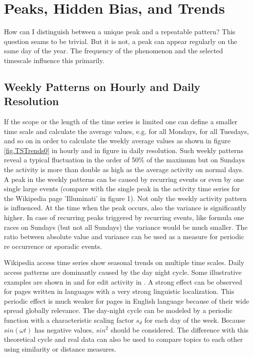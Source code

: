 \documentclass[a4paper,10pt]{scrbook}
\begin{document}
\section{Peaks, Hidden Bias, and Trends}

How can I distinguish between a unique peak and a repeatable pattern? This question seams to be trivial. But it is not, a peak can appear regularly on the same day of the year. The frequency of the phenomenon and the selected timescale influence this primarily. 

\subsection{Weekly Patterns on Hourly and Daily Resolution}
If the scope or the length of the time series is limited one can define a smaller time scale and calculate the average values, e.g. for all Mondays, for all Tuesdays, and so on in order to calculate the weekly average values as shown in figure \ref{fig.TSTrends0} in hourly and in figure \label{fig.TSTrends1} in daily resolution. Such weekly patterns reveal a typical fluctuation in the order of 50\% of the maximum but on Sundays the activity is more than double as high as the average activity on normal days. A peak in the weekly patterns can be caused by recurring events or even by one single large events (compare with the single peak in the activity time series for the Wikipedia page 'Illuminati' in \cite{Kaempf2012b} figure 1). Not only the weekly activity pattern is influenced. At the time when the peak occurs, also the variance is significantly higher. In case of recurring peaks triggered by recurring events, like formula one races on Sundays (but not all Sundays) the variance would be much smaller. The ratio between absolute value and variance can be used as a measure for periodic re occurrence  or sporadic events. 

\label{ext.fig.TSTrends0} 


Wikipedia access time series show seasonal trends on multiple time scales. Daily access patterns are dominantly caused by the day night cycle. Some illustrative examples are shown in \cite{2013arXiv1308.1776S} and for edit activity in \cite{Yasseri2012}. A strong effect can be observed for pages written in languages with a very strong linguistic localization. This periodic effect is much weaker for pages in English language because of their wide spread globally relevance. The day-night cycle can be modeled by a periodic function with a characteristic scaling factor $s_d$ for each day of the week. Because $sin( \omega t)$ has negative values, $sin^2$ should be considered. The difference with this theoretical cycle and real data can also be used to compare topics to each other using similarity or distance measures. 
\end{document}
